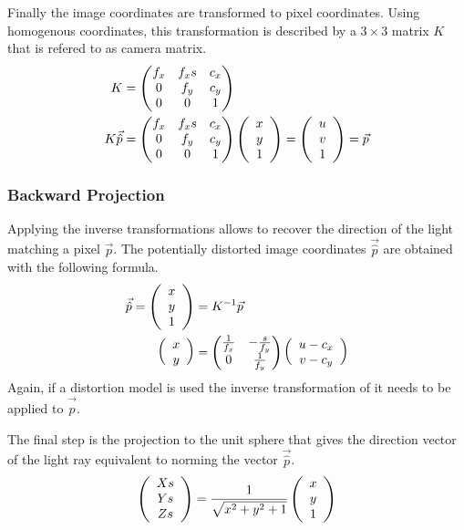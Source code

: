 Finally the image coordinates are transformed to pixel coordinates.
Using homogenous coordinates, this transformation is described by a $3 \times 3$ matrix $K$ that is refered to as camera matrix.
\begin{equation}
\begin{aligned}
K &= \begin{pmatrix}
        f_x & f_x s & c_x \\
        0   & f_y   & c_y \\
        0   & 0     & 1
     \end{pmatrix} \\
K \vec{\hat{p}} &= \begin{pmatrix}
        f_x & f_x s & c_x \\
        0   & f_y   & c_y \\
        0   & 0     & 1
     \end{pmatrix}\left(\begin{array}{c} x \\ y \\ 1 \end{array}\right) = \left(\begin{array}{c} u \\ v \\ 1 \end{array}\right) = \vec{p}
\end{aligned}
\end{equation}

\subsubsection*{Backward Projection}

Applying the inverse transformations allows to recover the direction of the light matching a pixel $\vec{p}$.
The potentially distorted image coordinates $\vec{\hat{p}}$ are obtained with the following formula.
\begin{equation}
\begin{aligned}
    \vec{\hat{p}} = \left(\begin{array}{c} x \\ y \\ 1 \end{array}\right) &= K^{-1} \vec{p} \\
    \left(\begin{array}{c} x \\ y \end{array}\right) &= \begin{pmatrix}\frac{1}{f_x} & -\frac{s}{f_y} \\ 0 & \frac{1}{f_y}\end{pmatrix} \left(\begin{array}{c} u - c_x \\ v - c_y \end{array}\right)
\end{aligned}
\end{equation}
Again, if a distortion model is used the inverse transformation of it needs to be applied to $\vec{\hat{p}}$.

The final step is the projection to the unit sphere that gives the direction vector of the light ray equivalent to norming the vector $\vec{\hat{p}}$.
\begin{equation}
    \left(\begin{array}{c} Xs \\ Ys \\ Zs \end{array}\right) = \frac{1}{\sqrt{x^2 + y^2 + 1}} \left(\begin{array}{c} x \\ y \\ 1 \end{array}\right)
    \label{eq:pinhole_backward}
\end{equation}

